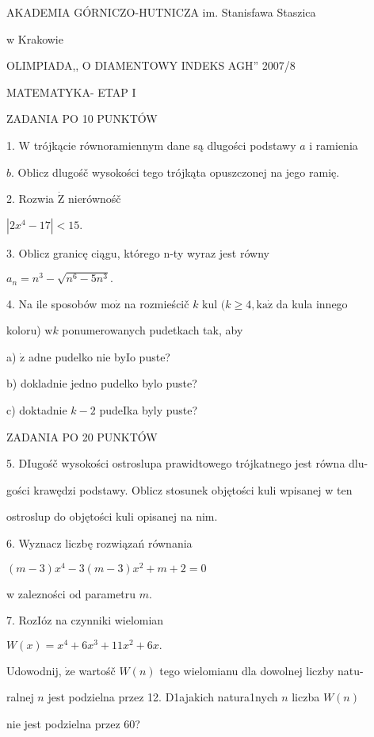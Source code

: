 \documentclass[a4paper,12pt]{article}
\begin{document}
AKADEMIA GÓRNICZO-HUTNICZA im. Stanisfawa Staszica

w Krakowie

OLIMPIADA,, O DIAMENTOWY INDEKS AGH'' 2007/8

MATEMATYKA- ETAP I

ZADANIA PO 10 PUNKTÓW

1. $\mathrm{W}$ trójkącie równoramiennym dane są dlugości podstawy $a$ i ramienia

$b$. Oblicz dlugośč wysokości tego trójkąta opuszczonej na jego ramię.

2. Rozwia $\dot{\mathrm{Z}}$ nierównośč

$|2x^{4}-17|<15.$

3. Oblicz granicę ciągu, którego n-ty wyraz jest równy

$a_{n}=n^{3}-\sqrt{n^{6}-5n^{3}}.$

4. Na ile sposobów $\mathrm{m}\mathrm{o}\dot{\mathrm{z}}$ na rozmieścič $k$ kul $(k \geq 4, \mathrm{k}\mathrm{a}\dot{\mathrm{z}}$ da kula innego

koloru) $\mathrm{w}k$ ponumerowanych pudetkach tak, aby

a) $\dot{\mathrm{z}}$ adne pudelko nie byIo puste?

b) dokladnie jedno pudelko bylo puste?

c) doktadnie $k-2$ pudeIka byly puste?

ZADANIA PO 20 PUNKTÓW

5. DIugośč wysokości ostroslupa prawidtowego trójkatnego jest równa dlu-

gości krawędzi podstawy. Oblicz stosunek objętości kuli wpisanej w ten

ostroslup do objętości kuli opisanej na nim.

6. Wyznacz liczbę rozwiązań równania

$(m-3)x^{4}-3(m-3)x^{2}+m+2=0$

w zalezności od parametru $m.$

7. RozIóz na czynniki wielomian

$W(x)=x^{4}+6x^{3}+11x^{2}+6x.$

Udowodnij, $\dot{\mathrm{z}}\mathrm{e}$ wartośč $W(n)$ tego wielomianu dla dowolnej liczby natu-

ralnej $n$ jest podzielna przez 12. D1ajakich natura1nych $n$ liczba $W(n)$

nie jest podzielna przez 60?
\end{document}

